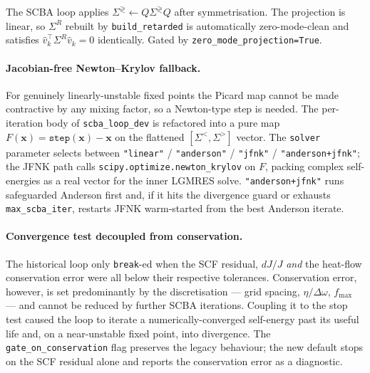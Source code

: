 The SCBA loop applies $\Sigma^{\gtrless}\leftarrow Q\Sigma^{\gtrless}Q$
after symmetrisation. The projection is linear, so $\Sigma^{R}$ rebuilt
by \texttt{build\_retarded} is automatically zero-mode-clean and
satisfies $\hat{v}_{k}^{\top}\Sigma^{R} \hat{v}_{k}=0$ identically.
Gated by \texttt{zero\_mode\_projection=True}.

\paragraph{Jacobian-free Newton--Krylov fallback.}
For genuinely linearly-unstable fixed points the Picard map cannot be
made contractive by any mixing factor, so a Newton-type step is
needed. The per-iteration body of \texttt{scba\_loop\_dev} is
refactored into a pure map
$F(\mathbf{x})=\mathtt{step}(\mathbf{x})-\mathbf{x}$ on the flattened
$[\Sigma^{<},\Sigma^{>}]$ vector. The \texttt{solver} parameter
selects between
\texttt{"linear"} / \texttt{"anderson"} / \texttt{"jfnk"} /
\texttt{"anderson+jfnk"}; the JFNK path calls
\texttt{scipy.optimize.newton\_krylov} on $F$, packing complex
self-energies as a real vector for the inner LGMRES solve.
\texttt{"anderson+jfnk"} runs safeguarded Anderson first and, if it
hits the divergence guard or exhausts \texttt{max\_scba\_iter},
restarts JFNK warm-started from the best Anderson iterate.

\paragraph{Convergence test decoupled from conservation.}
The historical loop only \texttt{break}-ed when the SCF residual,
$dJ/J$ \emph{and} the heat-flow conservation error were all below
their respective tolerances. Conservation error, however, is set
predominantly by the discretisation --- grid spacing, $\eta/\Delta\omega$,
$f_{\max}$ --- and cannot be reduced by further SCBA iterations.
Coupling it to the stop test caused the loop to iterate a
numerically-converged self-energy past its useful life and, on a
near-unstable fixed point, into divergence. The
\texttt{gate\_on\_conservation} flag preserves the legacy behaviour;
the new default stops on the SCF residual alone and reports the
conservation error as a diagnostic.

